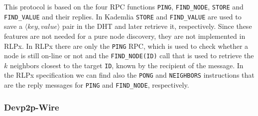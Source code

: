 This protocol is based on the four RPC functions \verb|PING|, \verb|FIND_NODE|,
\verb|STORE| and \verb|FIND_VALUE| and their replies.
In Kademlia \verb|STORE| and \verb|FIND_VALUE| are used to save a 
$\langle key, value\rangle$ pair in the DHT and later retrieve it, respectively.
Since these features are not needed for a pure node discovery, they
are not implemented in RLPx.
In RLPx there are only the \verb|PING| RPC, which is used to check whether a
node is still on-line or not and the \verb|FIND_NODE(ID)| call that is used to
retrieve the $k$ neighbors closest to the target \verb|ID|, known by the
recipient of the message. In the RLPx specification we can find also 
the \verb|PONG| and \verb|NEIGHBORS| instructions that are the reply messages
for \verb|PING| and \verb|FIND_NODE|, respectively.





\subsubsection{Devp2p-Wire}

